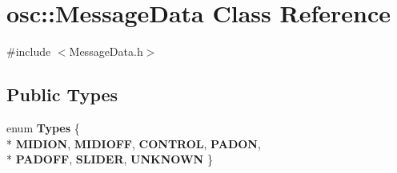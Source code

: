 \hypertarget{classosc_1_1MessageData}{\section{osc\-:\-:Message\-Data Class Reference}
\label{classosc_1_1MessageData}
}


{\ttfamily \#include $<$Message\-Data.\-h$>$}

\subsection*{Public Types}
\begin{DoxyCompactItemize}
\item 
enum {\bfseries Types} \{ \\*
{\bfseries M\-I\-D\-I\-O\-N}, 
{\bfseries M\-I\-D\-I\-O\-F\-F}, 
{\bfseries C\-O\-N\-T\-R\-O\-L}, 
{\bfseries P\-A\-D\-O\-N}, 
\\*
{\bfseries P\-A\-D\-O\-F\-F}, 
{\bfseries S\-L\-I\-D\-E\-R}, 
{\bfseries U\-N\-K\-N\-O\-W\-N}
 \}
\end{DoxyCompactItemize}
